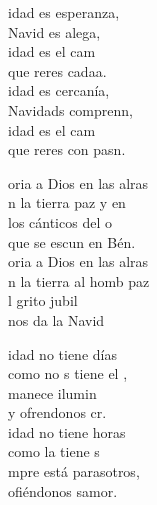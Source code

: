 \begin{cancion}%
	idad es esperanza, \\
	Navid es alega,\\
	idad es el cam \\
	que reres cadaa.\\
	idad es cercanía, \\
	Navidads comprenn,\\
	idad es el cam \\
	que reres con pasn.\jump\\
	\begin{chorus}%
		oria a Dios en las alras\\
		n la tierra paz y en\\
		los cánticos del o\\
		que se escun en Bén.\\
		oria a Dios en las alras\\
		n la tierra al homb paz\\
		l grito jubil \\
		 nos da la Navid \jump\\
	\end{chorus}%
	idad no tiene días \\
	como no s tiene el ,\\
	manece ilumin \\
	y ofrendonos cr.\\
	idad no tiene horas\\
	como  la tiene s\\
	mpre está parasotros,\\
	ofiéndonos samor.\\
\end{cancion}%
